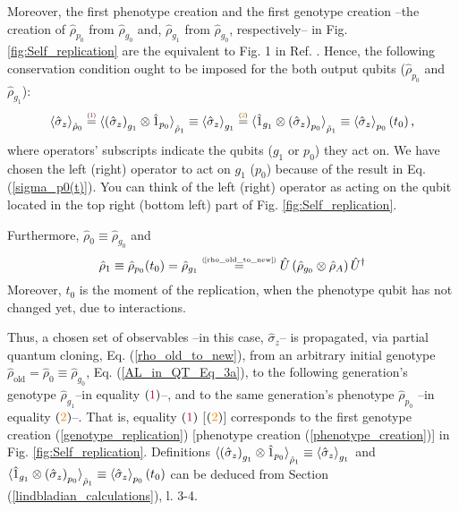 \documentclass[11pt]{article}
\numberwithin{equation}{section} %
\numberwithin{figure}{section} %
\newcommand\numeq[1] %
  {\stackrel{\scriptscriptstyle(\mkern-1.5mu#1\mkern-1.5mu)}{=}}
\begin{document}
Moreover, the first {\color{orange}phenotype creation} and the first {\color{purple}genotype creation} --the creation of $\hat{\rho}_{p_0}$ from $\hat{\rho}_{g_0}$ and, $\hat{\rho}_{g_1}$ from $\hat{\rho}_{g_0}$, respectively-- in Fig. \ref{fig:Self_replication} are the equivalent to Fig. 1 in Ref. \cite[p.~2]{Bio_Cloning}. Hence, the following conservation condition ought to be imposed for the both output qubits ($\hat{\rho}_{p_0}$ and $\hat{\rho}_{g_1}$): $\,\,\,$ \cite[p.~2, Eq.~(1a)]{AL_in_QT} \cite[p.~1, Eq.~(1)]{Bio_Cloning} \cite[p.~2, Eq.~(1)]{Ferraro}
\begin{equation} \label{preservation_condition}
\braket{\hat{\sigma}_z}_{\hat{\rho}_0} \numeq{{\color{purple}1}} \braket{ \left(\hat{\sigma}_z\right)_{g_1}\otimes \hat{1}_{p_0}}_{\hat{\rho}_1}\equiv \braket{\hat{\sigma}_z}_{g_1} \numeq{{\color{orange}2}} \braket{\hat{1}_{g_1}\otimes\left(\hat{\sigma}_z\right)_{p_0}}_{\hat{\rho}_1}\equiv\braket{\hat{\sigma}_z}_{p_0}(t_0)\,\textrm{,}
\end{equation}
where operators' subscripts indicate the qubits ($g_1$ or $p_0$) they act on. We have chosen the left (right) operator to act on $g_1$ ($p_0$) because of the result in Eq. (\ref{sigma_p0(t)}). You can think of the left (right) operator as acting on the qubit located  in the top right (bottom left) part of Fig. \ref{fig:Self_replication}.

Furthermore, $\hat{\rho}_0\equiv\hat{\rho}_{g_0}$ and 
\begin{equation} \label{rho_p0_and_rho_g1}
\hat{\rho}_1\equiv \hat{\rho}_{p_0}(t_0)=\hat{\rho}_{g_1}\numeq{\textrm{\ref{rho_old_to_new}}} \hat{U}\,(\hat{\rho}_{g_0}\otimes\hat{\rho}_A)\,\hat{U}^\dagger
\end{equation}
Moreover, $t_0$ is the moment of the replication, when the phenotype qubit has not changed yet, due to interactions.

Thus, a chosen set of observables --in this case, $\hat{\sigma}_z$-- is propagated, via partial quantum cloning, Eq. (\ref{rho_old_to_new}), from an arbitrary initial genotype $\hat{\rho}_{\textrm{old}}=\hat{\rho}_{0}\equiv\hat{\rho}_{g_0}$, Eq. (\ref{AL_in_QT_Eq_3a}), to the following generation's genotype $\hat{\rho}_{g_1}$--in equality $({\color{purple}1})$--, and to the same generation's phenotype $\hat{\rho}_{p_0}$ --in equality $({\color{orange}2})$--. That is, equality $({\color{purple}1})$ [$({\color{orange}2})$] corresponds to the first {\color{purple}genotype creation} (\ref{genotype_replication}) [{\color{orange}phenotype creation} (\ref{phenotype_creation})] in Fig. \ref{fig:Self_replication}. Definitions $\braket{ \left(\hat{\sigma}_z\right)_{g_1}\otimes \hat{1}_{p_0}}_{\hat{\rho}_1}\equiv \braket{\hat{\sigma}_z}_{g_1}$ and $\braket{\hat{1}_{g_1}\otimes\left(\hat{\sigma}_z\right)_{p_0}}_{\hat{\rho}_1}\equiv\braket{\hat{\sigma}_z}_{p_0}(t_0)$ can be deduced from Section (\ref{lindbladian_calculations}), l. 3-4.
\end{document}
